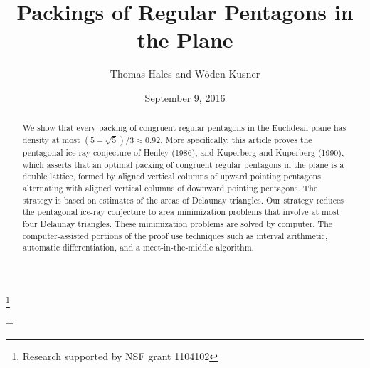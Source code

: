 \documentclass{amsart}
\theoremstyle{plain}
\theoremstyle{definition}
\theoremstyle{remark}
\begin{document}
\title
    {Packings of Regular Pentagons in the Plane}
\author{Thomas Hales and W\"oden Kusner}
\date{September 9, 2016}
\thanks{Research supported by NSF grant 1104102}

\begin{abstract}  
We show that every packing of congruent regular pentagons in the Euclidean plane has
density at most $(5-\sqrt5)/3\approx 0.92$.     More specifically,
this article proves the pentagonal ice-ray
conjecture of Henley (1986), and Kuperberg and Kuperberg (1990), 
which asserts that an optimal packing of congruent regular pentagons in the plane is a double lattice,
formed by aligned vertical columns of upward pointing pentagons alternating
with aligned vertical columns of downward pointing pentagons.  The strategy is based on estimates
of the areas of Delaunay triangles.  Our strategy reduces the pentagonal ice-ray conjecture to
area minimization problems that involve at most four Delaunay triangles.  These minimization problems
are solved by computer.  The computer-assisted portions of the proof use techniques such as
interval arithmetic, automatic differentiation, and a meet-in-the-middle algorithm.
\end{abstract}


\parskip=\baselineskip

 \maketitle



    

      
      
       
%
      
      
%





%
\end{document}
